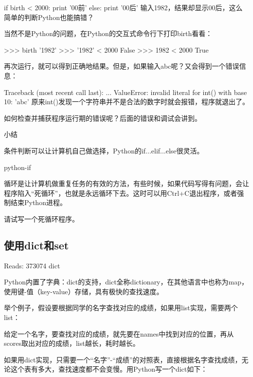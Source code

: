 

if birth < 2000:
    print '00前'
else:
    print '00后'
输入1982，结果却显示00后，这么简单的判断Python也能搞错？

当然不是Python的问题，在Python的交互式命令行下打印birth看看：

>>> birth
'1982'
>>> '1982' < 2000
False
>>> 1982 < 2000
True

再次运行，就可以得到正确地结果。但是，如果输入abc呢？又会得到一个错误信息：

Traceback (most recent call last):
  ...
ValueError: invalid literal for int() with base 10: 'abc'
原来int()发现一个字符串并不是合法的数字时就会报错，程序就退出了。

如何检查并捕获程序运行期的错误呢？后面的错误和调试会讲到。

小结

条件判断可以让计算机自己做选择，Python的if...elif...else很灵活。

python-if

循环是让计算机做重复任务的有效的方法，有些时候，如果代码写得有问题，会让程序陷入“死循环”，也就是永远循环下去。这时可以用Ctrl+C退出程序，或者强制结束Python进程。


请试写一个死循环程序。






\subsection{使用dict和set}

Reads: 373074
dict

Python内置了字典：dict的支持，dict全称dictionary，在其他语言中也称为map，使用键-值（key-value）存储，具有极快的查找速度。

举个例子，假设要根据同学的名字查找对应的成绩，如果用list实现，需要两个list：

给定一个名字，要查找对应的成绩，就先要在names中找到对应的位置，再从scores取出对应的成绩，list越长，耗时越长。

如果用dict实现，只需要一个“名字”-“成绩”的对照表，直接根据名字查找成绩，无论这个表有多大，查找速度都不会变慢。用Python写一个dict如下：

